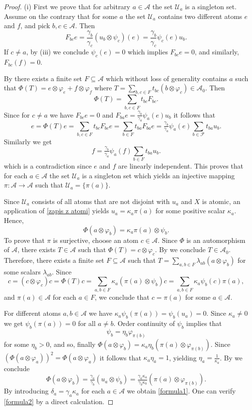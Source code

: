 \documentclass[10pt,a4paper]{amsart}
\begin{document}
\begin{proof}
(i) First we prove that for arbitrary $a\in\mathcal A$ the set ${\mathcal U}_a$ is a singleton set.
Assume on the contrary that for some $a$ the set $\mathcal U_a$ contains two different atoms $e$ and $f$, and pick $b, c\in \mathcal A$. Then 
$$F_{bc}e=\frac{\gamma_b}{\gamma_c}(u_b\otimes\psi_c)(e)=\frac{\gamma_b}{\gamma_c}\psi_c(e)u_b.$$
If $c\ne a$, by (iii) we conclude $\psi_c(e)=0$ which implies
$F_{bc}e=0$, and similarly, $F_{bc}(f)=0$.

By  there exists a finite set $F\subseteq \mathcal A$ which without loss of generality contains $a$ such that $\Phi(T)=e\otimes \varphi_e +f\otimes\varphi_f$  where $T=\sum_{b,c\in F}t_{bc}(b\otimes\varphi_c)\in \mathscr A_0$. Then 
$$\Phi(T)=\sum_{b,c\in F}t_{bc}F_{bc}.$$
Since for $c\ne a$ we have $F_{bc}e=0$ and $F_{ba}e=\frac{\gamma_b}{\gamma_a}\psi_a(e)u_b$ it follows that
$$e=\Phi(T)e=\sum_{b,c\in F}t_{bc}F_{bc}e=\sum_{b\in F}t_{ba}F_{ba}e= \tfrac{\gamma_b}{\gamma_a}\psi_a(e)\sum_{b\in\mathcal F}t_{ba}u_b.$$
Similarly we get
$$f=\tfrac{\gamma_b}{\gamma_a}\psi_a(f)\sum_{b\in F}t_{ba}u_b.$$
which is a contradiction since $e$ and $f$ are linearly independent. This proves that for each $a\in \mathcal A$ the set $\mathcal U_a$ is a singleton set which yields an injective mapping $\pi\colon \mathcal A\to \mathcal A$ such that ${\mathcal U}_a=\{\pi(a)\}$. 

Since $\mathcal U_a$ consists of all atoms that are not disjoint with $u_a$ and $X$ is atomic, an application of \eqref{zapis z atomi} yields $u_a=\kappa_a\pi(a)$ for some positive scalar $\kappa_a$. Hence, 
$$\Phi(a\otimes \varphi_b)=\kappa_a\pi(a)\otimes \psi_b.$$
To prove that $\pi$ is surjective, choose an atom $c\in\mathcal A$. Since $\Phi$ is an automorphism of $\mathscr A$, there exists $T\in \mathscr A$ such that $\Phi(T)=c\otimes \varphi_c$. By
 we conclude $T\in \mathscr A_0$. Therefore, there exists a finite set $F\subseteq \mathcal A$ such that 
$T=\sum_{a,b\in F} \lambda_{ab}(a\otimes \varphi_b)$ for some scalars $\lambda_{ab}$.  Since
$$c=(c\otimes \varphi_c)c=\Phi(T)c=\sum_{a,b\in F}\kappa_a (\pi(a)\otimes \psi_b)c=\sum_{a,b\in F}\kappa_a \psi_b(c)\pi(a),$$ and $\pi(a)\in \mathcal A$ for each $a\in F$, we conclude that $c=\pi(a)$ for some $a\in \mathcal A$. 

For different atoms $a,b\in\mathcal A$ we have $\kappa_a\psi_b(\pi(a))=\psi_b(u_a)=0$. Since $\kappa_a\ne 0$ we get $\psi_b(\pi(a))=0$ for all $a\ne b$. Order continuity of $\psi_b$ implies that
$$\psi_b=\eta_b\varphi_{\pi(b)}$$
for some $\eta_b>0$, and so, finally
$\Phi(a\otimes\varphi_b)=\kappa_a\eta_b(\pi(a)\otimes\varphi_{\pi(b)}).$
Since $(\Phi(a\otimes\varphi_a))^2=\Phi(a\otimes\varphi_a)$ it follows that $\kappa_a\eta_a=1$, yielding $\eta_a=\frac{1}{\kappa_a}$.
By  we conclude
$$\Phi(a\otimes\varphi_b)=\tfrac{\gamma_a}{\gamma_b} (u_a\otimes \psi_b)=\tfrac{\gamma_a\kappa_a}{\gamma_b\kappa_b}(\pi(a)\otimes\varphi_{\pi(b)}).$$
By introducing $\delta_a=\gamma_a\kappa_a$ for each $a\in \mathcal A$ we obtain \eqref{formula1}. One can verify \eqref{formula2} by a direct calculation. 


\end{proof}
\end{document}
